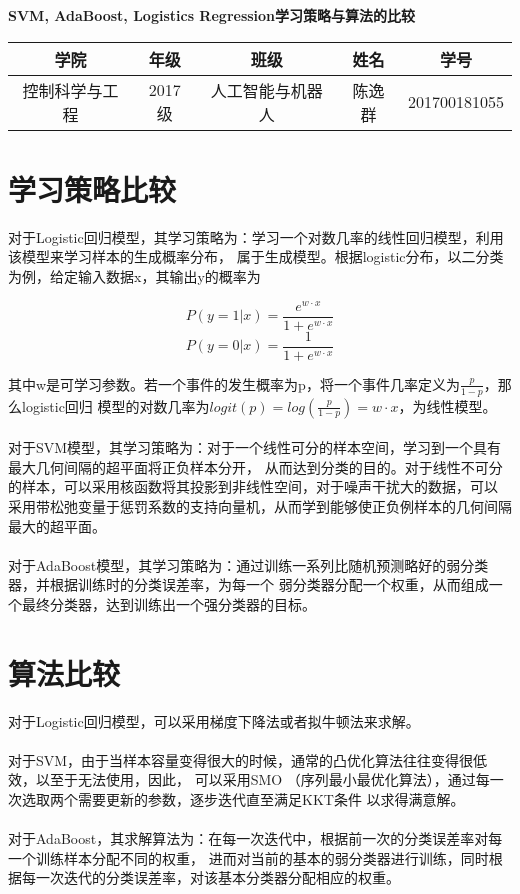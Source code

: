 \documentclass{article}
\begin{document}
\begin{center}
    \textbf{SVM, AdaBoost, Logistics Regression学习策略与算法的比较}
\end{center}

\begin{center}
    \begin{tabular}{c c c c c}
        \hline
        学院 & 年级 & 班级 & 姓名 & 学号 \\
        \hline
        控制科学与工程 & 2017级 & 人工智能与机器人 & 陈逸群 & 201700181055 \\
        \hline
    \end{tabular}
\end{center}

\section{学习策略比较}
对于Logistic回归模型，其学习策略为：学习一个对数几率的线性回归模型，利用该模型来学习样本的生成概率分布，
属于生成模型。根据logistic分布，以二分类为例，给定输入数据x，其输出y的概率为
\begin{center}
    $$
    P(y=1|x) = \frac{e^{w\cdot x}}{1+e^{w\cdot x}}
    $$
    $$
    P(y=0|x) = \frac{1}{1+e^{w\cdot x}}
    $$
\end{center}
其中w是可学习参数。若一个事件的发生概率为p，将一个事件几率定义为$ \frac{p}{1-p} $，那么logistic回归
模型的对数几率为$ logit(p) = log(\frac{p}{1-p}) = w\cdot x $，为线性模型。\\\\
对于SVM模型，其学习策略为：对于一个线性可分的样本空间，学习到一个具有最大几何间隔的超平面将正负样本分开，
从而达到分类的目的。对于线性不可分的样本，可以采用核函数将其投影到非线性空间，对于噪声干扰大的数据，可以
采用带松弛变量于惩罚系数的支持向量机，从而学到能够使正负例样本的几何间隔最大的超平面。\\\\
对于AdaBoost模型，其学习策略为：通过训练一系列比随机预测略好的弱分类器，并根据训练时的分类误差率，为每一个
弱分类器分配一个权重，从而组成一个最终分类器，达到训练出一个强分类器的目标。
\section{算法比较}
对于Logistic回归模型，可以采用梯度下降法或者拟牛顿法来求解。\\\\
对于SVM，由于当样本容量变得很大的时候，通常的凸优化算法往往变得很低效，以至于无法使用，因此，
可以采用SMO （序列最小最优化算法），通过每一次选取两个需要更新的参数，逐步迭代直至满足KKT条件
以求得满意解。\\\\
对于AdaBoost，其求解算法为：在每一次迭代中，根据前一次的分类误差率对每一个训练样本分配不同的权重，
进而对当前的基本的弱分类器进行训练，同时根据每一次迭代的分类误差率，对该基本分类器分配相应的权重。
\end{document}
